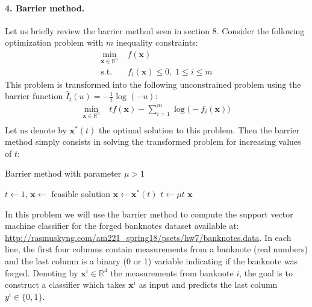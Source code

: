 \documentclass[11pt]{article}
\newcommand{\eps}{\varepsilon}
\theoremstyle{remark}
\newcommand{\R}{\mathbb{R}}                     %
\newcommand{\bx}{\mathbf{x}}
\begin{document}
\paragraph{4. Barrier method.}

Let us briefly review the barrier method seen in section 8. Consider the
following optimization problem with $m$ inequality constraints:
\begin{displaymath}
\begin{aligned}
    \min_{\bx\in\R^n} &\;f(\bx)\\
    \text{s.t.}&\; f_i(\bx)\leq 0,\; 1\leq i\leq m
\end{aligned}
\end{displaymath}
This problem is transformed into the following unconstrained problem using the
barrier function $\hat{I}_t(u) = -\frac{1}{t}\log (-u)$:
\begin{displaymath}
\begin{aligned}
    \min_{\bx\in\R^n} &\; t f(\bx) - \sum_{i=1}^m \log\big(-f_i(\bx)\big)\\
\end{aligned}
\end{displaymath}
Let us denote by $\bx^*(t)$ the optimal solution to this problem. Then the
barrier method simply consists in solving the transformed problem for
increasing values of $t$:

\begin{algorithm}
    \caption{Barrier method with parameter $\mu > 1$}
    \label{alg:bls}
    \begin{algorithmic}[1]
        \STATE $t\gets 1$, $\bx\gets$ feasible solution
        \WHILE{$\frac{m}{t}\geq \eps$}
        \STATE $\bx\gets \bx^*(t)$ \quad 
            \STATE $t\gets \mu t$
        \ENDWHILE
        \RETURN $\bx$
    \end{algorithmic}
\end{algorithm}

In this problem we will use the barrier method to compute the support vector
machine classifier for the forged banknotes dataset available at:
\url{http://rasmuskyng.com/am221_spring18/psets/hw7/banknotes.data}.
In each line, the first four columns contain measurements from a banknote (real numbers) and the last column
is a binary (0 or 1) variable indicating if the banknote was forged. Denoting
by $\bx^i\in\R^4$ the measurements from banknote $i$, the goal is to construct
a classifier which takes $\bx^i$ as input and predicts the last column
$y^i\in\{0, 1\}$.
\end{document}

